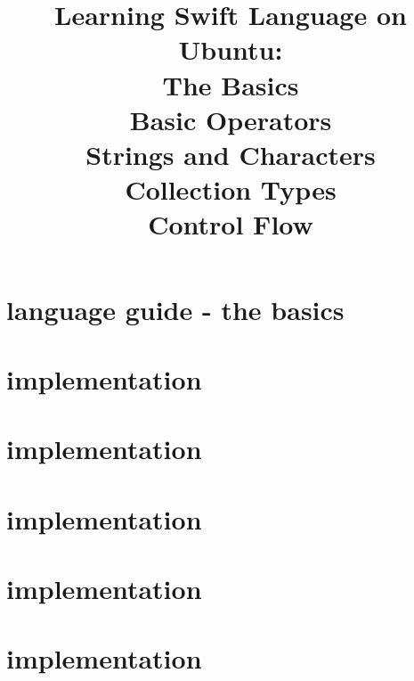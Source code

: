 \documentclass[uplatex,dvipdfmx]{jsarticle} \usepackage{amsmath,amssymb,bm}
\title{Learning Swift Language on Ubuntu:\\The Basics\\Basic Operators\\Strings and Characters\\Collection Types\\Control Flow} \author{} \date{}
\begin{document}
\maketitle

\section*{language guide - the basics}

\section*{implementation}




\section*{implementation}




\section*{implementation}




\section*{implementation}


\section*{implementation}


\vspace{\baselineskip}
\begin{paracol}{2}
\switchcolumn
\end{paracol}
\end{document}

